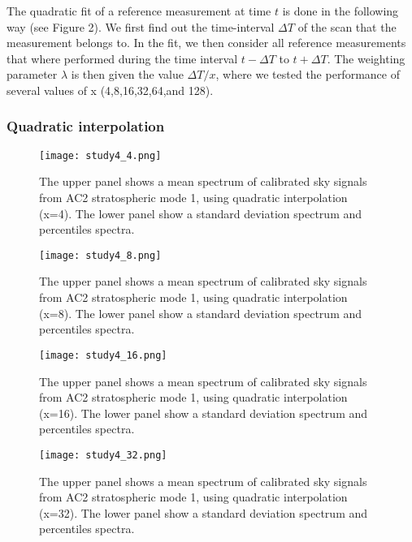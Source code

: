 The quadratic fit of a reference measurement at time \(t\)
is done in the following way (see Figure 2).  
We first find out the time-interval \(\Delta T\) of the scan that
the measurement belongs to. 
In the fit, we then consider all reference measurements
that where performed during the time interval 
\(t-\Delta T\) to \(t+\Delta T\). 
The weighting parameter \(\lambda\) is then given
the value  \(\Delta T /x\), where we tested the performance
of several values of x (4,8,16,32,64,and 128).

\clearpage
\newpage
\subsubsection{Quadratic interpolation}
\begin{figure}[!t]
\centering
\texttt{[image: study4\_4.png]}\\
\caption{The upper panel shows a mean spectrum of calibrated
sky signals from AC2 stratospheric mode 1,
using quadratic interpolation (x=4). 
The lower panel show a standard deviation spectrum
and percentiles spectra.}
\label{fig:study4_4.png}
\end{figure}

\begin{figure}[!t]
\centering
\texttt{[image: study4\_8.png]}\\
\caption{The upper panel shows a mean spectrum of calibrated
sky signals from AC2 stratospheric mode 1,
using quadratic interpolation (x=8). 
The lower panel show a standard deviation spectrum
and percentiles spectra.}
\label{fig:study4_8.png}
\end{figure}

\begin{figure}[!t]
\centering
\texttt{[image: study4\_16.png]}\\
\caption{The upper panel shows a mean spectrum of calibrated
sky signals from AC2 stratospheric mode 1,
using quadratic interpolation (x=16). 
The lower panel show a standard deviation spectrum
and percentiles spectra.}
\label{fig:study4_16.png}
\end{figure}

\begin{figure}[!t]
\centering
\texttt{[image: study4\_32.png]}\\
\caption{The upper panel shows a mean spectrum of calibrated
sky signals from AC2 stratospheric mode 1,
using quadratic interpolation (x=32). 
The lower panel show a standard deviation spectrum
and percentiles spectra.}
\label{fig:study4_32.png}
\end{figure}

